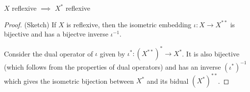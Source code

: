 \documentclass{article}
\begin{document}

\begin{unexaminable}
    \begin{proposition}
        $X$ reflexive $\implies$ $X^*$ reflexive
    \end{proposition}
    \begin{proof}(Sketch)
        If $X$ is reflexive, then the isometric embedding $\iota: X\to X^{**}$ is bijective and has a bijectve inverse $\iota^{-1}$.  

        Consider the dual operator of $\iota$ given by $\iota^*:(X^{**})^* \to X^*$. It is also bijective (which follows from the properties of dual operators) and has an inverse $(\iota^*)^{-1}$ which gives the isometric bijection between $X^*$ and its bidual $(X^*)^{**}$.  
    \end{proof}
\end{unexaminable}
\end{document}
